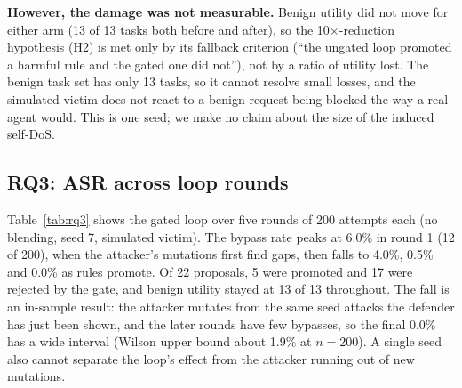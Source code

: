 \documentclass[11pt,a4paper]{article}
\begin{document}
\textbf{However, the damage was not measurable.} Benign utility did not move for either arm (13 of 13
tasks both before and after), so the 10$\times$-reduction hypothesis (H2) is met only by its
fallback criterion (``the ungated loop promoted a harmful rule and the gated one did not''), not by a
ratio of utility lost. The benign task set has only 13 tasks, so it cannot resolve small losses, and
the simulated victim does not react to a benign request being blocked the way a real agent would.
This is one seed; we make no claim about the size of the induced self-DoS.
\begin{table}[h]
\centering\small
\caption{RQ2: gated versus ungated loop (5 rounds $\times$ 200 attempts, blend rate 0.5, seed 7, simulated victim).}\label{tab:rq2}

\end{table}

\subsection{RQ3: ASR across loop rounds}
Table~\ref{tab:rq3} shows the gated loop over five rounds of 200 attempts each (no blending, seed 7,
simulated victim). The bypass rate peaks at 6.0\% in round 1 (12 of 200), when the attacker's
mutations first find gaps, then falls to 4.0\%, 0.5\% and 0.0\% as rules promote. Of 22 proposals,
5 were promoted and 17 were rejected by the gate, and benign utility stayed at 13 of 13 throughout.
The fall is an in-sample result: the attacker mutates from the same seed attacks the defender has
just been shown, and the later rounds have few bypasses, so the final 0.0\% has a wide interval
(Wilson upper bound about 1.9\% at $n=200$). A single seed also cannot separate the loop's effect
from the attacker running out of new mutations.
\begin{table}[h]
\centering\small
\caption{RQ3: gated loop ASR per round (simulated victim, seed 7).}\label{tab:rq3}

\end{table}
\end{document}
